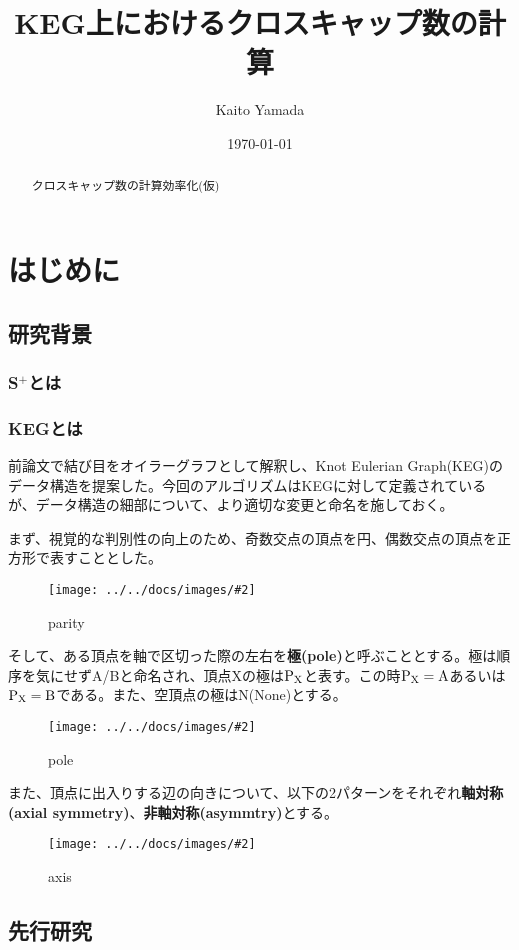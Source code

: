 \documentclass[11pt,a4j]{jarticle}
\title{KEG上におけるクロスキャップ数の計算}
\author{Kaito Yamada}
\date{\today}
\newcommand{\splus}{S${}^\text{+}$}
\newcommand{\f}[1]{$\rm{#1}$} %
\newcommand{\image}[4][height=100pt]{%
\begin{figure}[htbp]
    \centering
    \texttt{[image: ../../docs/images/\#2]}
    \caption{#3}
    \label{fig:#4}
\end{figure}%
}
\begin{document}
\maketitle
\vspace{30mm}
\begin{abstract}
    クロスキャップ数の計算効率化(仮)
\end{abstract}

\clearpage

\tableofcontents
\clearpage

\pagestyle{plain}
\lhead{\rightmark}

\section{はじめに}

\subsection{研究背景}
\subsubsection{\splus とは}
\subsubsection{KEGとは}
前論文\cite{keg}で結び目をオイラーグラフとして解釈し、Knot Eulerian Graph(KEG)のデータ構造を提案した。今回のアルゴリズムはKEGに対して定義されているが、データ構造の細部について、より適切な変更と命名を施しておく。

まず、視覚的な判別性の向上のため、奇数交点の頂点を円、偶数交点の頂点を正方形で表すこととした。
\image{about_parity.jpg}{parity}{parity}

そして、ある頂点を軸で区切った際の左右を\textbf{極(pole)}と呼ぶこととする。極は順序を気にせずA/Bと命名され、頂点Xの極は\f{P_X}と表す。この時\f{P_X=A}あるいは\f{P_X=B}である。また、空頂点の極はN(None)とする。
\image[height=300pt]{about_pole.jpg}{pole}{pole}

また、頂点に出入りする辺の向きについて、以下の2パターンをそれぞれ\textbf{軸対称(axial symmetry)}、\textbf{非軸対称(asymmtry)}とする。
\image{about_axis.jpg}{axis}{axis}

\subsection{先行研究}
\end{document}
